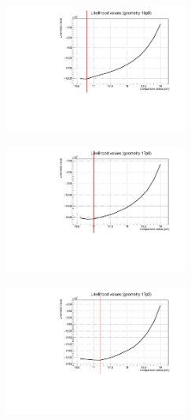 \documentclass[a4paper, 11pt]{report}
\begin{document}
\begin{figure}[htbp]
\centering
\begin{minipage}[b]{.32\textwidth}
\includegraphics[width=6cm, height=4.6cm]{figs/likelihood100HighStat/likelihood16p8.pdf}
\end{minipage}\hfill
\begin{minipage}[b]{.32\textwidth}
\includegraphics[width=6cm, height=4.6cm]{figs/likelihood100HighStat/likelihood17p0.pdf}
\end{minipage} \hfill
\begin{minipage}[b]{.32\textwidth}
\includegraphics[width=6cm, height=4.6cm]{figs/likelihood100HighStat/likelihood17p2.pdf}
\end{minipage} \hfill \vspace{10pt}


\end{figure}
\end{document}
